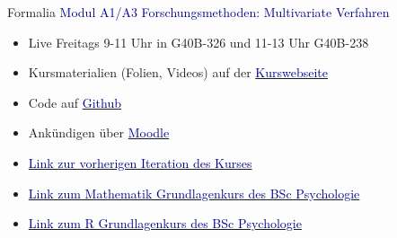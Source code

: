 \documentclass[
  8pt,
  ignorenonframetext,
]{beamer}
\providecommand{\tightlist}{%
  \setlength{\itemsep}{0pt}\setlength{\parskip}{0pt}}
\begin{document}
\begin{frame}{Formalia}
\protect\hypertarget{formalia}{}
\textcolor{darkblue}{Modul A1/A3 Forschungsmethoden: Multivariate Verfahren}

\begin{itemize}
\tightlist
\item
  Live Freitags 9-11 Uhr in G40B-326 und 11-13 Uhr G40B-238
\item
  Kursmaterialien (Folien, Videos) auf der
  \href{https://bit.ly/3Eye26S}{\textcolor{darkblue}{Kurswebseite}}
\item
  Code auf
  \href{https://github.com/dirk-ostwald/multivariate-datenanalyse-23}{\textcolor{darkblue}{Github}}
\item
  Ankündigen über
  \href{https://elearning.ovgu.de/course/view.php?id=13782}{\textcolor{darkblue}{Moodle}}
\item
  \href{https://bit.ly/3DAw0Dg}{\textcolor{darkblue}{Link zur vorherigen Iteration des Kurses}}
\item
  \href{https://bit.ly/3SNh3nR}{\textcolor{darkblue}{Link zum Mathematik Grundlagenkurs des BSc Psychologie}}
\item
  \href{https://bit.ly/3MvFcwi}{\textcolor{darkblue}{Link zum R Grundlagenkurs des BSc Psychologie}}
\end{itemize}
\end{frame}
\end{document}
